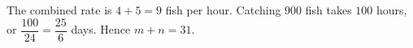 The combined rate is $4+5=9$ fish per hour. Catching $900$ fish takes $100$ hours, or $\dfrac{100}{24}=\dfrac{25}{6}$ days. Hence $m+n=\boxed{31}$.
